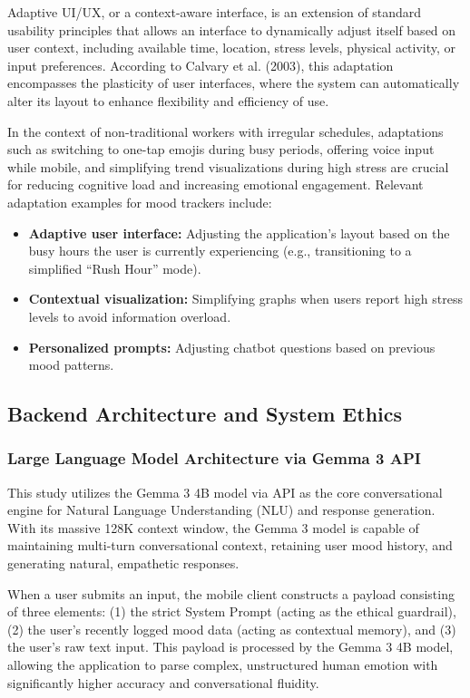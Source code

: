 Adaptive UI/UX, or a context-aware interface, is an extension of standard usability principles that allows an interface to dynamically adjust itself based on user context, including available time, location, stress levels, physical activity, or input preferences. According to Calvary et al. (2003), this adaptation encompasses the plasticity of user interfaces, where the system can automatically alter its layout to enhance flexibility and efficiency of use.

In the context of non-traditional workers with irregular schedules, adaptations such as switching to one-tap emojis during busy periods, offering voice input while mobile, and simplifying trend visualizations during high stress are crucial for reducing cognitive load and increasing emotional engagement. Relevant adaptation examples for mood trackers include:

\begin{itemize}
	\item \textbf{Adaptive user interface:} Adjusting the application's layout based on the busy hours the user is currently experiencing (e.g., transitioning to a simplified ``Rush Hour'' mode).
	\item \textbf{Contextual visualization:} Simplifying graphs when users report high stress levels to avoid information overload.
	\item \textbf{Personalized prompts:} Adjusting chatbot questions based on previous mood patterns.
\end{itemize}

\subsection{Backend Architecture and System Ethics}

\subsubsection{Large Language Model Architecture via Gemma 3 API}

This study utilizes the Gemma 3 4B model via API as the core conversational engine for Natural Language Understanding (NLU) and response generation. With its massive 128K context window, the Gemma 3 model is capable of maintaining multi-turn conversational context, retaining user mood history, and generating natural, empathetic responses.

When a user submits an input, the mobile client constructs a payload consisting of three elements: (1) the strict System Prompt (acting as the ethical guardrail), (2) the user's recently logged mood data (acting as contextual memory), and (3) the user's raw text input. This payload is processed by the Gemma 3 4B model, allowing the application to parse complex, unstructured human emotion with significantly higher accuracy and conversational fluidity.

